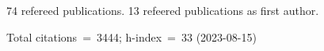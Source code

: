 74 refereed publications. 13 refeered publications as first author.

Total citations~=~3444; h-index~=~33 (2023-08-15)